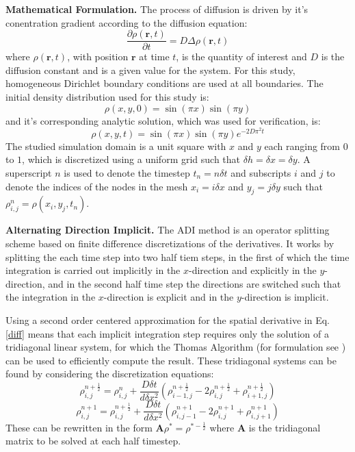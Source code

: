 \documentclass[letterpaper]{article}
\newcommand{\mypar}[1]{{\bf #1.}}
\begin{document}
\mypar{Mathematical Formulation}
The process of diffusion is driven by it's conentration gradient according to the diffusion equation:
\begin{equation}
\frac{\partial \rho(\mathbf{r},t)}{\partial t} = D\Delta\rho(\mathbf{r},t)
\label{diff}
\end{equation}
where $\rho(\mathbf{r},t)$, with position $\mathbf{r}$ at time $t$, is the quantity of interest and $D$ is the diffusion constant and is a given value for the system. For this study, homogeneous Dirichlet boundary conditions are used at all boundaries. The initial density distribution used for this study is:
\begin{equation}
\rho(x,y,0)=\sin(\pi x)\sin(\pi y)
\end{equation}
and it's corresponding analytic solution, which was used for verification, is:
\begin{equation}
\rho(x,y,t)=\sin(\pi x)\sin(\pi y)e^{-2D\pi^{2}t}
\label{analytic}
\end{equation}
The studied simulation domain is a unit square with $x$ and $y$ each ranging from $0$ to $1$, which is discretized using a uniform grid such that $\delta h=\delta x=\delta y$. A superscript $n$ is used to denote the timestep $t_n=n\delta t$ and subscripts $i$ and $j$ to denote the indices of the nodes in the mesh $x_i=i\delta x$ and $y_j=j\delta y$ such that $\rho_{i,j}^{n}=\rho(x_i,y_j,t_n)$.

\mypar{Alternating Direction Implicit}
The ADI method is an operator splitting scheme based on finite difference discretizations of the derivatives. It works by splitting the each time step into two half tiem steps, in the first of which the time integration is carried out implicitly in the $x$-direction and explicitly in the $y$-direction, and in the second half time step the directions are switched such that the integration in the $x$-direction is explicit and in the $y$-direction is implicit.

Using a second order centered approximation for the spatial derivative in Eq. \eqref{diff} means that each implicit integration step requires only the solution of a tridiagonal linear system, for which the Thomas Algorithm (for formulation see \cite{thomas}) can be used to efficiently compute the result. These tridiagonal systems can be found by considering the discretization equations:
\begin{equation}
\rho_{i,j}^{n+\frac{1}{2}}=\rho_{i,j}^n+\frac{D\delta t}{d\delta x^2}(\rho_{i-1,j}^{n+\frac{1}{2}}-2\rho_{i,j}^{n+\frac{1}{2}}+\rho_{i+1,j}^{n+\frac{1}{2}})
\end{equation}
\begin{equation}
\rho_{i,j}^{n+1}=\rho_{i,j}^{n+\frac{1}{2}}+\frac{D\delta t}{d\delta x^2}(\rho_{i,j-1}^{n+1}-2\rho_{i,j}^{n+1}+\rho_{i,j+1}^{n+1})
\end{equation}
These can be rewritten in the form $\mathbf{A}\rho^*=\rho^{*-\frac{1}{2}}$ where $\mathbf{A}$ is the tridiagonal matrix to be solved at each half timestep.
\end{document}
